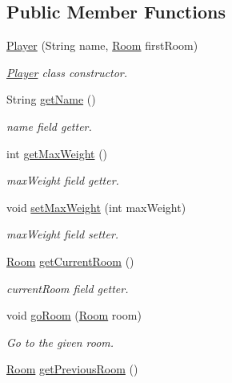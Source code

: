 \subsection*{Public Member Functions}
\begin{DoxyCompactItemize}
\item 
\hyperlink{classpkg__world_1_1Player_a8a48bf28cae733a412a0114802a1e4fb}{Player} (String name, \hyperlink{classpkg__world_1_1Room}{Room} first\-Room)
\begin{DoxyCompactList}\small\item\em \hyperlink{classpkg__world_1_1Player}{Player} class constructor. \end{DoxyCompactList}\item 
String \hyperlink{classpkg__world_1_1Player_afb52f93ed1c1ee43462f0c33ca3abcf0}{get\-Name} ()
\begin{DoxyCompactList}\small\item\em name field getter. \end{DoxyCompactList}\item 
int \hyperlink{classpkg__world_1_1Player_a700bc1762736bd44d91e40ad9ae2ff76}{get\-Max\-Weight} ()
\begin{DoxyCompactList}\small\item\em max\-Weight field getter. \end{DoxyCompactList}\item 
void \hyperlink{classpkg__world_1_1Player_a6218134478709a2e1c4438f2c9f94b8a}{set\-Max\-Weight} (int max\-Weight)
\begin{DoxyCompactList}\small\item\em max\-Weight field setter. \end{DoxyCompactList}\item 
\hyperlink{classpkg__world_1_1Room}{Room} \hyperlink{classpkg__world_1_1Player_a5ff0ede152d97c0c9cf6603c9a422a77}{get\-Current\-Room} ()
\begin{DoxyCompactList}\small\item\em current\-Room field getter. \end{DoxyCompactList}\item 
void \hyperlink{classpkg__world_1_1Player_af694ca81b712f2ba0e18c3ae73c03bd4}{go\-Room} (\hyperlink{classpkg__world_1_1Room}{Room} room)
\begin{DoxyCompactList}\small\item\em Go to the given room. \end{DoxyCompactList}\item 
\hyperlink{classpkg__world_1_1Room}{Room} \hyperlink{classpkg__world_1_1Player_adcff90c8c1b6fd5dcb3c4516d7e3a277}{get\-Previous\-Room} ()

\end{DoxyCompactItemize}
